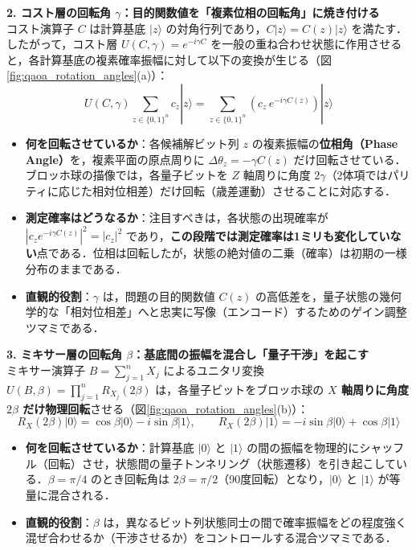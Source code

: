 \documentclass[11pt,a4paper,oneside,openany]{ltjsbook}
\theoremstyle{definition}
\theoremstyle{plain}
\theoremstyle{remark}
\newcommand{\ket}[1]{|#1\rangle}
\begin{document}
\medskip
\noindent\textbf{2. コスト層の回転角 $\gamma$：目的関数値を「複素位相の回転角」に焼き付ける}\\[1.5mm]
コスト演算子 $C$ は計算基底 $\ket{z}$ の対角行列であり，$C \ket{z} = C(z) \ket{z}$ を満たす．したがって，コスト層 $U(C, \gamma) = e^{-i \gamma C}$ を一般の重ね合わせ状態に作用させると，各計算基底の複素確率振幅に対して以下の変換が生じる（図\ref{fig:qaoa_rotation_angles}(a)）：
\begin{equation}
    U(C, \gamma) \sum_{z \in \{0,1\}^n} c_z \ket{z} = \sum_{z \in \{0,1\}^n} \left( c_z \, e^{-i \gamma C(z)} \right) \ket{z}
\end{equation}
\begin{itemize}
    \item \textbf{何を回転させているか}：各候補解ビット列 $z$ の複素振幅の\textbf{位相角（Phase Angle）}を，複素平面の原点周りに $\Delta \theta_z = -\gamma C(z)$ だけ回転させている．ブロッホ球の描像では，各量子ビットを $Z$ 軸周りに角度 $2\gamma$（2体項ではパリティに応じた相対位相差）だけ回転（歳差運動）させることに対応する．
    \item \textbf{測定確率はどうなるか}：注目すべきは，各状態の出現確率が $|c_z e^{-i \gamma C(z)}|^2 = |c_z|^2$ であり，\textbf{この段階では測定確率は1ミリも変化していない}点である．位相は回転したが，状態の絶対値の二乗（確率）は初期の一様分布のままである．
    \item \textbf{直観的役割}：$\gamma$ は，問題の目的関数値 $C(z)$ の高低差を，量子状態の幾何学的な「相対位相差」へと忠実に写像（エンコード）するためのゲイン調整ツマミである．
\end{itemize}

\medskip
\noindent\textbf{3. ミキサー層の回転角 $\beta$：基底間の振幅を混合し「量子干渉」を起こす}\\[1.5mm]
ミキサー演算子 $B = \sum_{j=1}^n X_j$ によるユニタリ変換 $U(B, \beta) = \prod_{j=1}^n R_{X_j}(2\beta)$ は，各量子ビットをブロッホ球の \textbf{$X$ 軸周りに角度 $2\beta$ だけ物理回転}させる（図\ref{fig:qaoa_rotation_angles}(b)）：
\begin{equation}
    R_X(2\beta) \ket{0} = \cos\beta \ket{0} - i \sin\beta \ket{1}, \qquad R_X(2\beta) \ket{1} = -i \sin\beta \ket{0} + \cos\beta \ket{1}
\end{equation}
\begin{itemize}
    \item \textbf{何を回転させているか}：計算基底 $\ket{0}$ と $\ket{1}$ の間の振幅を物理的にシャッフル（回転）させ，状態間の量子トンネリング（状態遷移）を引き起こしている．$\beta = \pi/4$ のとき回転角は $2\beta = \pi/2$（90度回転）となり，$\ket{0}$ と $\ket{1}$ が等量に混合される．
    \item \textbf{直観的役割}：$\beta$ は，異なるビット列状態同士の間で確率振幅をどの程度強く混ぜ合わせるか（干渉させるか）をコントロールする混合ツマミである．
\end{itemize}
\end{document}

